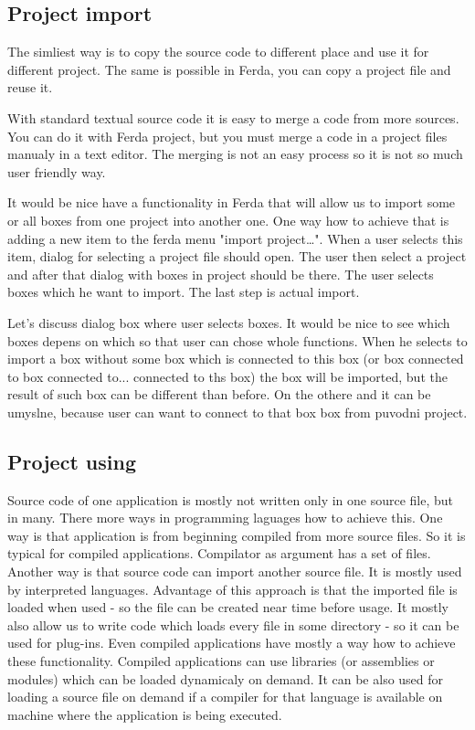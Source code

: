 \documentclass{article}
\begin{document}
\subsection{Project import}
The simliest way is to copy the source code to different place and use it for different project. The same is possible in Ferda, you can copy a project file and reuse it.

With standard textual source code it is easy to merge a code from more sources. You can do it with Ferda project, but you must merge a code in a project files manualy in a text editor. The merging is not an easy process so it is not so much user friendly way.

It would be nice have a functionality in Ferda that will allow us to import some or all boxes from one project into another one. One way how to achieve that is adding a new item to the ferda menu "import project\dots". When a user selects this item, dialog for selecting a project file should open. The user then select a project and after that dialog with boxes in project should be there. The user selects boxes which he want to import. The last step is actual import.

Let's discuss dialog box where user selects boxes. It would be nice to see which boxes depens on which so that user can chose whole functions. When he selects to import a box without some box which is connected to this box (or box connected to box connected to... connected to ths box) the box will be imported, but the result of such box can be different than before. On the othere and it can be umyslne, because user can want to connect to that box box from puvodni project.

\subsection{Project using}
Source code of one application is mostly not written only in one source file, but in many. There more ways in programming laguages how to achieve this. One way is that application is from beginning compiled from more source files. So it is typical for compiled applications. Compilator as argument has a set of files. Another way is that source code can import another source file. It is mostly used by interpreted languages. Advantage of this approach is that the imported file is loaded when used - so the file can be created near time before usage. It mostly also allow us to write code which loads every file in some directory - so it can be used for plug-ins. Even compiled applications have mostly a way how to achieve these functionality. Compiled applications can use libraries (or assemblies or modules) which can be loaded dynamicaly on demand. It can be also used for loading a source file on demand if a compiler for that language is available on machine where the application is being executed.
\end{document}
